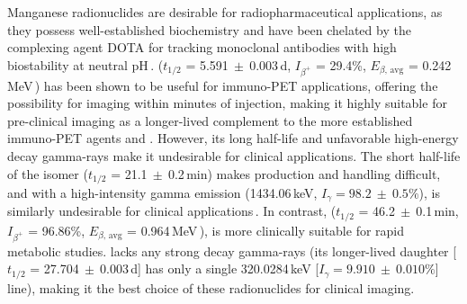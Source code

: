 Manganese radionuclides are desirable for radiopharmaceutical applications, as 
they possess well-established biochemistry and have been 
chelated 
by the complexing agent DOTA for tracking monoclonal antibodies with high biostability at neutral pH\,\cite{Graves2015}.
 ($t_{1/2}$ = 5.591$~\pm~$0.003\,d, $I_{\beta^+}$ = 29.4\%, $E_{\beta\text{, avg}}$ = 0.242\,MeV\,\cite{Dong2015}) has been shown to be useful for immuno-PET applications, 
offering the possibility for imaging within minutes of injection,
making it highly suitable for pre-clinical imaging as a longer-lived complement   to the more established immuno-PET agents  and   .  
However, its  long half-life and unfavorable high-energy decay gamma-rays 
make it undesirable for clinical applications.
The short half-life of the   isomer ($t_{1/2}$ = 21.1$~\pm~$0.2\,min)
makes production and handling difficult, and with a  high-intensity gamma emission (1434.06\,keV, $I_\gamma = 98.2~\pm~0.5\%$),  
 is similarly undesirable for clinical applications\,\cite{Dong2015}.
In contrast,  ($t_{1/2}$ = 46.2$~\pm~$0.1\,min, $I_{\beta^+}$ = 96.86\%, $E_{\beta\text{, avg}}$ = 0.964\,MeV\,\cite{PhysRevC.96.014613,Wang2017}), 
is more clinically suitable for rapid metabolic studies.
 lacks any strong decay gamma-rays (its longer-lived daughter  [$t_{1/2}$ = 27.704$~\pm~$0.003\,d] has only a single  320.0284\,keV [$I_\gamma = 9.910~\pm~0.010\%$] line), making it the best choice of these radionuclides for clinical imaging.



